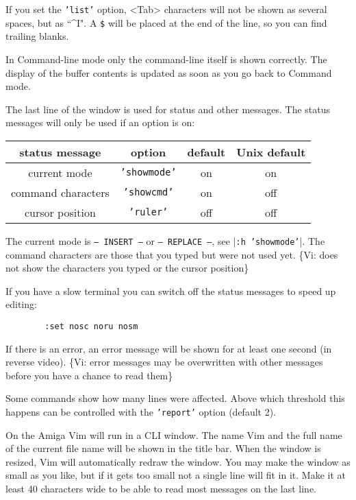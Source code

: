 If you set the \texttt{'list'} option, <Tab> characters will not be shown as several spaces, but as ``\textasciicircum I".
A \texttt{\$} will be placed at the end of the line, so you can find trailing blanks.

In Command-line mode only the command-line itself is shown correctly.
The display of the buffer contents is updated as soon as you go back to Command mode.

The last line of the window is used for status and other messages.
The status messages will only be used if an option is on:
\begin{center}
				\begin{tabular}{|c|c|c|c|}
								\hline
								status message     & option     & default & Unix default\\ \hline
								current mode       & \texttt{'showmode'} & on      & on\\ \hline
								command characters & \texttt{'showcmd'}  & on      & off\\ \hline
								cursor position    & \texttt{'ruler'}    & off     & off\\ \hline
				\end{tabular}
\end{center}

The current mode is \texttt{-- INSERT --} or \texttt{-- REPLACE --}, see |\texttt{:h 'showmode'}|.
The command characters are those that you typed but were not used yet.
\{Vi: does not show the characters you typed or the cursor position\}

If you have a slow terminal you can switch off the status messages to speed up editing:
		\begin{verbatim}
		:set nosc noru nosm
		\end{verbatim}

If there is an error, an error message will be shown for at least one second (in reverse video).
\{Vi: error messages may be overwritten with other messages before you have a chance to read them\}

Some commands show how many lines were affected.
Above which threshold this happens can be controlled with the \texttt{'report'} option (default 2).

On the Amiga Vim will run in a CLI window.
The name Vim and the full name of the current file name will be shown in the title bar.
When the window is resized, Vim will automatically redraw the window.
You may make the window as small as you like, but if it gets too small not a single line will fit in it.
Make it at least 40 characters wide to be able to read most messages on the last line.

